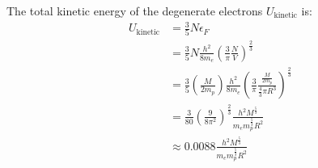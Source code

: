 \documentclass{article}
\begin{document}
\clearpage

The total kinetic energy of the degenerate electrons $U_{\text{kinetic}}$ is:
\begin{equation}
    \begin{split}
        U_{\text{kinetic}} & = \frac{3}{5}N\epsilon_F \\
        & = \frac{3}{5}N\frac{h^2}{8m_e}(\frac{3}{\pi}\frac{N}{V})^{\frac{2}{3}} \\
        & = \frac{3}{5}(\frac{M}{2m_p})\frac{h^2}{8m_e}(\frac{3}{\pi}\frac{\frac{M}{2m_p}}{\frac{4}{3}\pi R^3})^{\frac{2}{3}} \\
        & = \frac{3}{80}(\frac{9}{8\pi^2})^{\frac{2}{3}}\frac{h^2M^{\frac{5}{3}}}{m_em_p^{\frac{5}{3}}R^2} \\
        & \approx 0.0088\frac{h^2M^{\frac{5}{3}}}{m_em_p^{\frac{5}{3}}R^2} \\
    \end{split}
\end{equation}
\begin{center}
\end{center}
\end{document}
